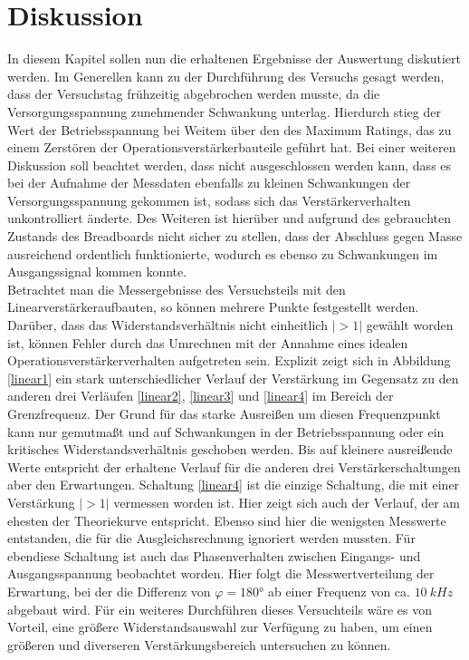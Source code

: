 \section{Diskussion}
In diesem Kapitel sollen nun die erhaltenen Ergebnisse der Auswertung diskutiert werden.
Im Generellen kann zu der Durchführung des Versuchs gesagt werden, dass der Versuchstag frühzeitig abgebrochen werden musste, da die Versorgungsspannung zunehmender Schwankung unterlag. Hierdurch stieg der Wert der Betriebsspannung bei Weitem über den des Maximum Ratings, das zu einem Zerstören der Operationsverstärkerbauteile geführt hat.
Bei einer weiteren Diskussion soll beachtet werden, dass nicht ausgeschlossen werden kann, dass es bei der Aufnahme der Messdaten ebenfalls zu kleinen Schwankungen der Versorgungsspannung gekommen ist, sodass sich das Verstärkerverhalten unkontrolliert änderte. Des Weiteren ist hierüber und aufgrund des gebrauchten Zustands des Breadboards nicht sicher zu stellen, dass der Abschluss gegen Masse ausreichend ordentlich funktionierte, wodurch es ebenso zu Schwankungen im Ausgangssignal kommen konnte.\\
Betrachtet man die Messergebnisse des Versuchsteils mit den Linearverstärkeraufbauten, so können mehrere Punkte festgestellt werden. Darüber, dass das Widerstandsverhältnis nicht einheitlich $|>1|$ gewählt worden ist, können Fehler durch das Umrechnen mit der Annahme eines idealen Operationsverstärkerverhalten aufgetreten sein.
Explizit zeigt sich in Abbildung \ref{linear1} ein stark unterschiedlicher Verlauf der Verstärkung im Gegensatz zu den anderen drei Verläufen \ref{linear2}, \ref{linear3} und \ref{linear4} im Bereich der Grenzfrequenz. Der Grund für das starke Ausreißen um diesen Frequenzpunkt kann nur gemutmaßt und auf Schwankungen in der Betriebsspannung oder ein kritisches Widerstandsverhältnis geschoben werden. Bis auf kleinere ausreißende Werte entspricht der erhaltene Verlauf für die anderen drei Verstärkerschaltungen aber den Erwartungen. Schaltung \ref{linear4} ist die einzige Schaltung, die mit einer Verstärkung $|>1|$ vermessen worden ist. Hier zeigt sich auch der Verlauf, der am ehesten der Theoriekurve entspricht. Ebenso sind hier die wenigsten Messwerte entstanden, die für die Ausgleichsrechnung ignoriert werden mussten.
Für ebendiese Schaltung ist auch das Phasenverhalten zwischen Eingangs- und Ausgangsspannung beobachtet worden. Hier folgt die Messwertverteilung der Erwartung, bei der die Differenz von $\varphi=180°$ ab einer Frequenz von ca. $\SI{10}{kHz}$ abgebaut wird. Für ein weiteres Durchführen dieses Versuchteils wäre es von Vorteil, eine größere Widerstandsauswahl zur Verfügung zu haben, um einen größeren und diverseren Verstärkungsbereich untersuchen zu können.\\
